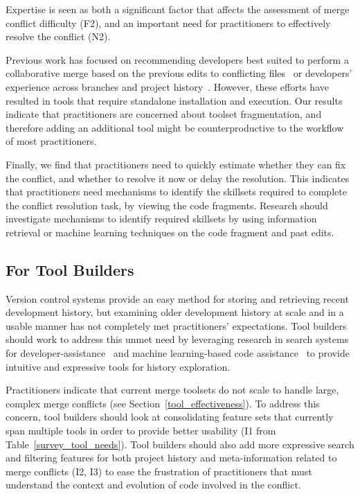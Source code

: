 Expertise is seen as both a significant factor that affects the assessment of merge conflict difficulty (F2), and an important need for practitioners to effectively resolve the conflict (N2).

Previous work has focused on recommending developers best suited to perform a collaborative merge based on the previous edits to conflicting files~\cite{dasilva2015niche} or developers' experience across branches and project history~\cite{CostaSarma}. 
However, these efforts have resulted in tools that require standalone installation and execution. 
Our results indicate that practitioners are concerned about toolset fragmentation, and therefore adding an additional tool might be counterproductive to the workflow of most practitioners. 

Finally, we find that practitioners need to quickly estimate whether they can fix the conflict, and whether to resolve it now or delay the resolution. 
This indicates that practitioners need mechanisms to identify the skillsets required to complete the conflict resolution task, by viewing the code fragments.
Research should investigate mechanisms to identify required skillsets by using information retrieval or machine learning techniques on the code fragment and past edits.

\subsection{For Tool Builders}
Version control systems provide an easy method for storing and retrieving recent development history, but examining older development history at scale and in a usable manner has not completely met practitioners' expectations.
Tool builders should work to address this unmet need by leveraging research in search systems for developer-assistance~\cite{nabi2016putting} and machine learning-based code assistance~\cite{bradley2011history_exploration} to provide intuitive and expressive tools for history exploration.

Practitioners indicate that current merge toolsets do not scale to handle large, complex merge conflicts (see Section~\ref{tool_effectiveness}).
To address this concern, tool builders should look at consolidating feature sets that currently span multiple tools in order to provide better usability (I1 from Table~\ref{survey_tool_needs}).
Tool builders should also add more expressive search and filtering features for both project history and meta-information related to merge conflicts (I2, I3) to ease the frustration of practitioners that must understand the context and evolution of code involved in the conflict.

